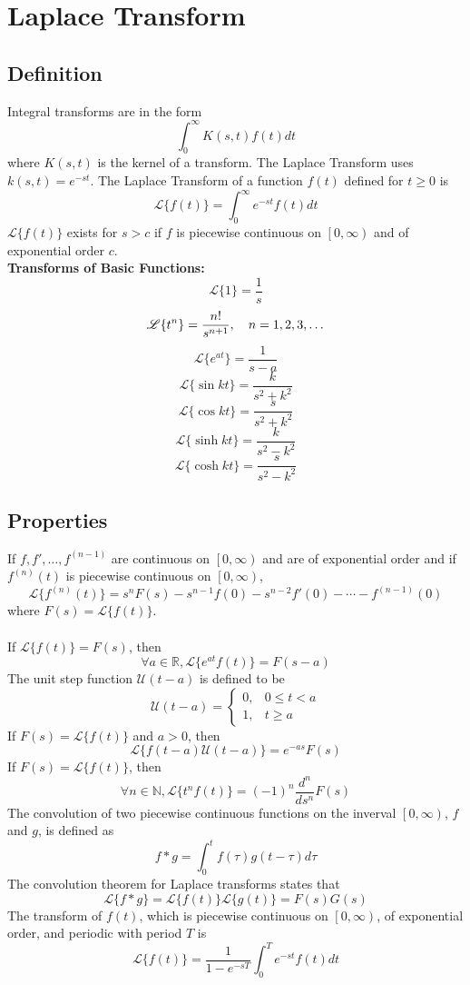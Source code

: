\documentclass{article}
\begin{document}
\section{Laplace Transform}
\subsection{Definition}
Integral transforms are in the form
$$\int_0^\infty K(s,t) f(t) dt$$
where $K(s,t)$ is the kernel of a transform. The Laplace Transform uses $k(s,t) = e^{-st}$. The Laplace Transform of a function $f(t)$ defined for $t \geq 0$ is 
$$ \mathscr L \{ f(t) \} = \int _0^\infty e^{-st} f(t) dt$$
$\mathscr L\{ f(t) \}$ exists for $s > c$ if $f$ is piecewise continuous on $\left[ 0, \infty \right)$ and of exponential order $c$. 
\\\textbf{Transforms of Basic Functions:}
$$\mathscr L \{1 \}  = \frac{1}{s}$$
$$\mathscr L \{t^n \}= \frac{n!}{s^{n+1}} , \hspace{10 pt} n = 1, 2, 3, \dots$$
$$\mathscr L \{e^ {at} \} = \frac{1}{s - a}$$
$$\mathscr L \{\sin kt \} = \frac{k}{s^2 +k^2}$$
$$\mathscr L \{\cos kt \} = \frac{s}{s^2 + k^2}$$
$$\mathscr L \{\sinh kt \} = \frac{k}{s^2 - k^2}$$
$$\mathscr L \{\cosh kt \} = \frac{s}{s^2 -k^2 }$$
\subsection{Properties}
If $f, f', \dots, f^{(n-1)}$ are continuous on $\left[ 0, \infty \right)$ and are of exponential order and if $f^{(n)} (t)$ is piecewise continuous on $\left[0, \infty \right)$, 
$$\mathscr L \{ f^{(n)} (t) \} = s^n F(s) -s^{n-1} f(0) - s^{n-2} f'(0) - \cdots - f^{(n-1)} (0)$$
where $F(s) = \mathscr L \{ f(t) \}$.
\\
\\If $\mathscr L \{ f(t) \} = F(s)$, then 
$$\forall a \in \mathbb R ,\mathscr L \{e^{at} f(t) \} = F(s-a)$$
The unit step function $\mathscr U (t-a)$ is defined to be
$$\mathscr U (t-a) = \begin{cases} 
      0, & 0\leq t < a \\
      1, & t \geq a  
   \end{cases}$$
If $F(s) = \mathscr L \{f(t) \}$ and $a > 0$, then 
$$\mathscr L \{f(t-a) \mathscr U (t-a) \} = e^{-as} F(s)$$
If $ F(s) = \mathscr L \{f(t) \}$, then 
$$\forall n \in \mathbb N, \mathscr L \{t^n f(t) \} = (-1)^n \frac{d^n}{ds^n} F(s)$$
The convolution of two piecewise continuous functions on the inverval $\left[ 0 , \infty \right)$, $f$ and $g$, is defined as
$$f * g = \int_0 ^t f(\tau ) g( t - \tau ) d\tau$$
The convolution theorem for Laplace transforms states that
$$\mathscr L \{ f * g \} = \mathscr L \{f(t)\} \mathscr L \{g(t)\} = F(s)G(s)$$
The transform of $f(t)$, which is piecewise continuous on $\left[ 0, \infty \right)$, of exponential order, and periodic with period $T$ is
$$\mathscr L \{ f(t) \} = \frac{1}{1- e^{-sT}} \int^T_0 e^{-st} f(t) dt$$
\end{document}
